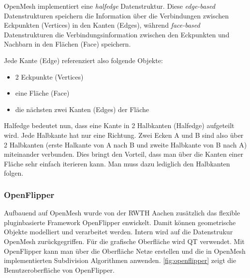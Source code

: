 OpenMesh implementiert eine \emph{halfedge} Datenstruktur.
Diese \emph{edge-based} Datenstrukturen speichern die Information über die Verbindungen zwischen Eckpunkten (Vertices) in den Kanten (Edges), während
\emph{face-based} Datenstrukturen die Verbindungsinformation zwischen den Eckpunkten und Nachbarn in den Flächen (Face) speichern.

Jede Kante (Edge) referenziert also folgende Objekte:

\begin{itemize}
	\item 2 Eckpunkte (Vertices)
	\item eine Fläche (Face)
	\item die nächsten zwei Kanten (Edges) der Fläche
\end{itemize}

Halfedge bedeutet nun, dass eine Kante in 2 Halbkanten (Halfedge) aufgeteilt wird. Jede Halbkante hat nur eine Richtung.
Zwei Ecken A und B sind also über 2 Halbkanten (erste Halkante von A nach B und zweite Halbkante von B nach A) miteinander verbunden.
Dies bringt den Vorteil, dass man über die Kanten einer Fläche sehr einfach iterieren kann. Man muss dazu lediglich den Halbkanten folgen.


\subsubsection{OpenFlipper}

Aufbauend auf OpenMesh wurde von der \acs{RWTH} Aachen zusätzlich das flexible pluginbasierte Framework OpenFlipper enwickelt.
Damit können geometrische Objekte modelliert und verarbeitet werden. Intern wird auf die Datenstrukur OpenMesh zurückgegriffen.
Für die grafische Oberfläche wird QT verwendet.
Mit OpenFlipper kann man über die Oberfläche Netze erstellen und die in OpenMesh implementierten Subdivision Algorithmen anwenden.
\autoref{fig:openflipper} zeigt die Benutzeroberfläche von OpenFlipper.

